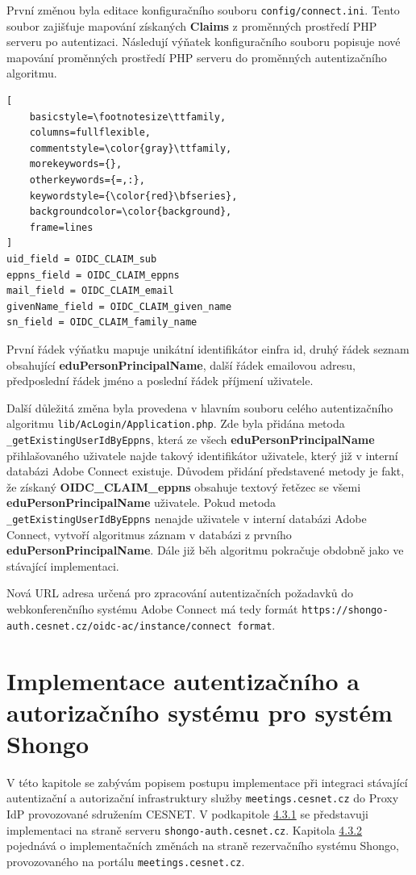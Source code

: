 \documentclass[
  printed, %
  twoside, %
  table,   %
  nolof,     %
  nolot,     %
]{fithesis3}
\begin{document}
První změnou byla editace konfiguračního souboru \texttt{config/connect.ini}. Tento soubor zajišťuje mapování získaných \textbf{Claims} z proměnných prostředí PHP serveru po autentizaci. Následují výňatek konfiguračního souboru popisuje nové mapování proměnných prostředí PHP serveru do proměnných autentizačního algoritmu. 

\begin{lstlisting}[
    basicstyle=\footnotesize\ttfamily,
    columns=fullflexible,
    commentstyle=\color{gray}\ttfamily,
    morekeywords={},
    otherkeywords={=,:},
    keywordstyle={\color{red}\bfseries},
    backgroundcolor=\color{background},
    frame=lines
]
uid_field = OIDC_CLAIM_sub
eppns_field = OIDC_CLAIM_eppns
mail_field = OIDC_CLAIM_email
givenName_field = OIDC_CLAIM_given_name
sn_field = OIDC_CLAIM_family_name
\end{lstlisting}
První řádek výňatku mapuje unikátní identifikátor einfra id, druhý řádek seznam obsahující \textbf{eduPersonPrincipalName}, další řádek emailovou adresu, předposlední řádek jméno a poslední řádek příjmení uživatele.  \par 

Další důležitá změna byla provedena v hlavním souboru celého autentizačního algoritmu \texttt{lib/AcLogin/Application.php}. Zde byla přidána metoda \texttt{\_getExistingUserIdByEppns}, která ze všech \textbf{eduPersonPrincipalName} přihlašovaného uživatele najde takový identifikátor uživatele, který již v interní databázi Adobe Connect existuje. Důvodem přidání představené metody je fakt, že získaný \textbf{ OIDC\_CLAIM\_eppns}  obsahuje textový řetězec se všemi \textbf{eduPersonPrincipalName} uživatele. Pokud metoda \texttt{\_getExistingUserIdByEppns} nenajde uživatele v interní databázi Adobe Connect, vytvoří algoritmus záznam v databázi z prvního \textbf{eduPersonPrincipalName}. Dále již běh algoritmu pokračuje obdobně jako ve stávající implementaci. \par 
Nová URL adresa určená pro zpracování autentizačních požadavků do webkonferenčního systému Adobe Connect má tedy formát \texttt{https://shongo-auth.cesnet.cz/oidc-ac/instance/connect format}.

\section{Implementace autentizačního a autorizačního systému pro systém Shongo}
\label{ShongoImpl}
V této kapitole se zabývám popisem postupu implementace při integraci stávající autentizační a autorizační infrastruktury služby \texttt{meetings.cesnet.cz} do Proxy IdP provozované sdružením CESNET. V podkapitole \hyperref[ShongoImpl-authn]{4.3.1} se představuji implementaci na straně serveru \texttt{shongo-auth.cesnet.cz}. Kapitola \hyperref[ShongoImpl-authn]{4.3.2} pojednává o implementačních změnách na straně rezervačního systému Shongo, provozovaného na portálu \texttt{meetings.cesnet.cz}. 
\end{document}

